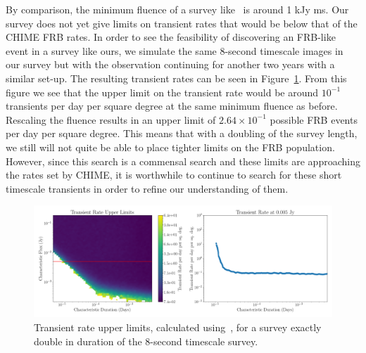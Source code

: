 \documentclass[12pt]{article}
\begin{document}
 By comparison, the minimum fluence of a survey like~\citet{2011ApJ...728L..14B} is around 1 kJy ms. Our survey does not yet give limits on transient rates that would be below that of the CHIME FRB rates. In order to see the feasibility of discovering an FRB-like event in a survey like ours, we simulate the same 8-second timescale images in our survey but with the observation continuing for another two years with a similar set-up. The resulting transient rates can be seen in Figure~\ref{fig:doublerate}. From this figure we see that the upper limit on the transient rate would be around $10^{-1}$ transients per day per square degree at the same minimum fluence as before. Rescaling the fluence results in an upper limit of $2.64\times 10^{-1}$ possible FRB events per day per square degree. This means that with a doubling of the survey length, we still will not quite be able to place tighter limits on the FRB population. However, since this search is a commensal search and these limits are approaching the rates set by CHIME, it is worthwhile to continue to search for these short timescale transients in order to refine our understanding of them. 
\begin{figure}
	\includegraphics[width=\textwidth]{doublerealint.png}
	\caption{Transient rate upper limits, calculated using~\citet{2022ascl.soft04007C}, for a survey exactly double in duration of the 8-second timescale survey.}
	\label{fig:doublerate}
\end{figure}
\end{document}
